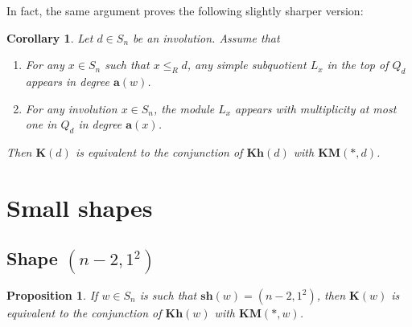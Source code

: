 \documentclass[a4paper]{amsart}
\newtheorem{corollary}[theorem]{Corollary}
\newtheorem{proposition}[theorem]{Proposition}
\begin{document}
In fact, the same argument proves the following slightly sharper version:

\begin{corollary}\label{cor:nicecase2}
Let $d\in S_n$ be an involution. Assume that
\begin{enumerate}[$($a$)$]
\item\label{cor:nicecase2.1} 
For any $x\in S_n$
such that $x\leq_R d$, any simple subquotient
$L_x$ in the top of $Q_d$
appears in degree $\mathbf{a}(w)$.
\item\label{cor:nicecase2.2} 
For any involution $x\in S_n$, the module $L_x$ appears with 
multiplicity at most one in  $Q_d$ in degree $\mathbf{a}(x)$. 
\end{enumerate}
Then $\mathbf{K}(d)$ is equivalent to
the conjunction of $\mathbf{Kh}(d)$ with $\mathbf{KM}(*,d)$.
\end{corollary}

\section{Small shapes}\label{s6}
\subsection{Shape $(n-2,1^2)$}\label{s6.1}

\begin{proposition}\label{prop:shape1}
If $w\in S_n$ is such that $\mathbf{sh}(w)=(n-2,1^2)$,
then $\mathbf{K}(w)$ is equivalent to the conjunction of
$\mathbf{Kh}(w)$ with $\mathbf{KM}(*,w)$.
\end{proposition}
\end{document}
